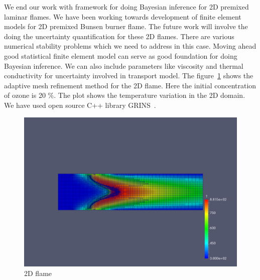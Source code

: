 We end our work with  framework for doing Bayesian inference for 2D premixed laminar flames. We have been working towards development of finite element models for 2D premixed Bunsen burner flame. The future work will involve the doing the uncertainty quantification for these 2D flames. There are various numerical stability problems which we need to address in this case. Moving ahead good statistical finite element model can serve as good foundation for doing Bayesian inference. We can also include parameters like viscosity and  thermal conductivity for uncertainty involved in transport model. The figure~\ref{amr_flame} shows the adaptive mesh refinement method for the 2D flame. Here the initial concentration of ozone is 20 $\%$.  The plot shows the temperature variation in the 2D domain. We have used open source C++ library GRINS~\cite{GRINSPaper}.

 \begin{figure}[h]
   \includegraphics[scale=0.35]{figs/flame_amr.pdf}
    \caption{2D flame}
    \label{amr_flame}
 \end{figure}

